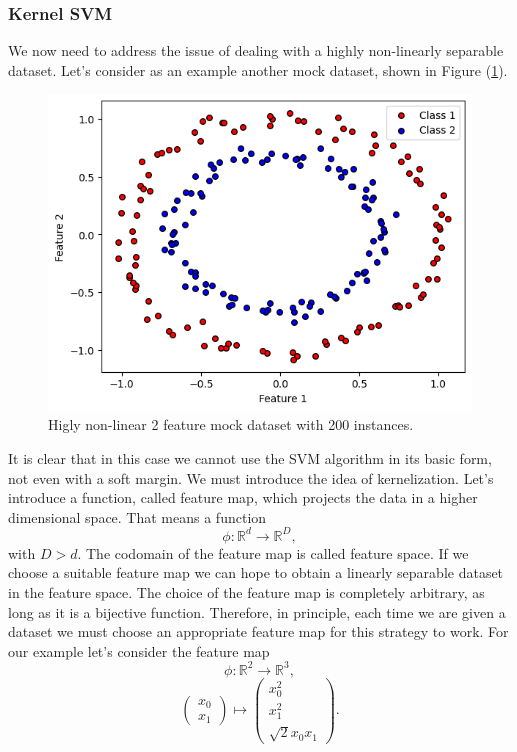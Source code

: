 \documentclass[a4paper]{article}
\begin{document}
\subsubsection{Kernel SVM}
We now need to address the issue of dealing with a highly non-linearly separable dataset. Let's consider as an example another mock dataset, shown in Figure (\ref{fig:classical svm circles}). 
\begin{figure}[h!]
    \centering
    \includegraphics[width=\textwidth]{images/circles.png}
    \caption{Higly non-linear 2 feature mock dataset with 200 instances.}
    \label{fig:classical svm circles}
\end{figure}
It is clear that in this case we cannot use the SVM algorithm in its basic form, not even with a soft margin. We must introduce the idea of kernelization. 
Let's introduce a function, called feature map, which projects the data in a higher dimensional space. That means a function
\begin{equation}
    \phi:\mathbb{R}^d\rightarrow\mathbb{R}^D,
\end{equation}
with $D>d$. The codomain of the feature map is called feature space. If we choose a suitable feature map we can hope to obtain a linearly separable dataset in the feature space. The choice of the feature map is completely arbitrary, as long as it is a bijective function. Therefore, in principle, each time we are given a dataset we must choose an appropriate feature map for this strategy to work. For our example let's consider the feature map
$$    \phi:\mathbb{R}^2\rightarrow\mathbb{R}^3,$$
\begin{equation}
    \begin{pmatrix}
        x_0\\
        x_1
        \end{pmatrix} \mapsto  
        \begin{pmatrix}
        x_0^2 \\
        x_1^2\\
        \sqrt{2}x_0x_1
        \end{pmatrix} .
\end{equation}
\end{document}
